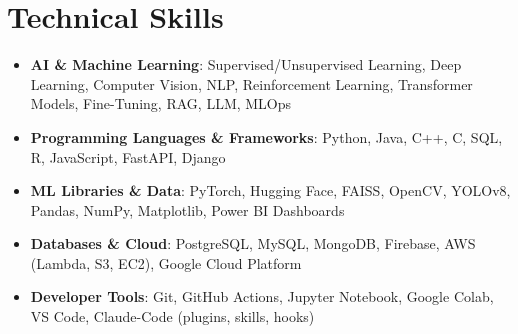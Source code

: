 \documentclass[letterpaper,11pt]{article}
\makeatletter
\newcommand{\resumeItem}[1]{\item\small{#1 \vspace{-4pt}}}
\newcommand{\resumeSubheading}[4]{
    \vspace{-2pt}\item
    \begin{tabular*}{1.0\textwidth}[t]{l@{\extracolsep{\fill}}r}
        \textbf{#1} & \textbf{\small #2} \\
        \textit{\small#3} & \textit{\small #4}
    \end{tabular*}\vspace{-7pt}
}
\newcommand{\resumeSubItem}[1]{\resumeItem{#1}\vspace{-4pt}}
\newcommand{\resumeSubHeadingListStart}{\begin{itemize}[leftmargin=0.0in, label={}]}
\newcommand{\resumeSubHeadingListEnd}{\end{itemize}}
\newcommand{\resumeItemListStart}{\begin{itemize}}
\newcommand{\resumeItemListEnd}{\end{itemize}\vspace{-7pt}}
\makeatother
\begin{document}




\vspace{-0.4cm}
\vspace{3pt}
\section{Technical Skills}
\resumeSubHeadingListStart
\resumeSubItem{\textbf{AI \& Machine Learning}{: Supervised/Unsupervised Learning, Deep Learning, Computer Vision, NLP, Reinforcement Learning, Transformer Models, Fine-Tuning, RAG, LLM, MLOps}}
\vspace{4pt}
\resumeSubItem{\textbf{Programming Languages \& Frameworks}{: Python, Java, C++, C, SQL, R, JavaScript, FastAPI, Django}}
\vspace{4pt}
\resumeSubItem{\textbf{ML Libraries \& Data}{: PyTorch, Hugging Face, FAISS, OpenCV, YOLOv8, Pandas, NumPy, Matplotlib, Power BI Dashboards}}
\vspace{4pt}
\resumeSubItem{\textbf{Databases \& Cloud}{: PostgreSQL, MySQL, MongoDB, Firebase, AWS (Lambda, S3, EC2), Google Cloud Platform}}
\vspace{4pt}
\resumeSubItem{\textbf{Developer Tools}{: Git, GitHub Actions, Jupyter Notebook, Google Colab, VS Code, Claude-Code (plugins, skills, hooks)}}
\resumeSubHeadingListEnd
\end{document}
